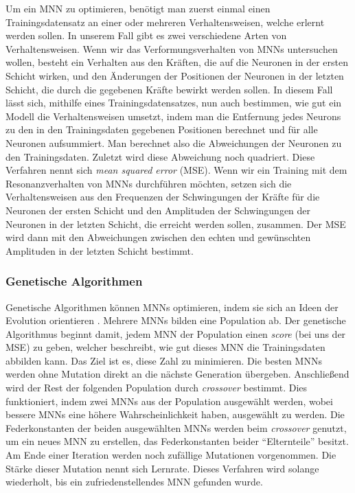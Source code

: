 \documentclass[10pt]{scrartcl}
\newcommand*{\eng}[1]{\textit{#1}}
\newcommand*{\feng}[1]{\eng{#1}}
\begin{document}
Um ein MNN zu optimieren, benötigt man zuerst einmal einen Trainingsdatensatz an einer oder mehreren Verhaltensweisen, welche erlernt werden sollen. In unserem Fall gibt es zwei verschiedene Arten von Verhaltensweisen. Wenn wir das Verformungsverhalten von MNNs untersuchen wollen, besteht ein Verhalten aus den Kräften, die auf die Neuronen in der ersten Schicht wirken, und den Änderungen der Positionen der Neuronen in der letzten Schicht, die durch die gegebenen Kräfte bewirkt werden sollen. In diesem Fall lässt sich, mithilfe eines Trainingsdatensatzes, nun auch bestimmen, wie gut ein Modell die Verhaltensweisen umsetzt, indem man die Entfernung jedes Neurons zu den in den Trainingsdaten gegebenen Positionen berechnet und für alle Neuronen aufsummiert. Man berechnet also die Abweichungen der Neuronen zu den Trainingsdaten. Zuletzt wird diese Abweichung noch quadriert. Diese Verfahren nennt sich \feng{mean squared error} (MSE).
Wenn wir ein Training mit dem Resonanzverhalten von MNNs durchführen möchten, setzen sich die Verhaltensweisen aus den Frequenzen der Schwingungen der Kräfte für die Neuronen der ersten Schicht und den Amplituden der Schwingungen der Neuronen in der letzten Schicht, die erreicht werden sollen, zusammen. Der MSE wird dann mit den Abweichungen zwischen den echten und gewünschten Amplituden in der letzten Schicht bestimmt.

\subsubsection{Genetische Algorithmen}

Genetische Algorithmen können MNNs optimieren, indem sie sich an Ideen der Evolution orientieren \cite{gentisch}. Mehrere MNNs bilden eine Population ab.
Der genetische Algorithmus beginnt damit, jedem MNN der Population einen \feng{score} (bei uns der MSE) zu geben, welcher beschreibt, wie gut dieses MNN die Trainingsdaten abbilden kann. Das Ziel ist es, diese Zahl zu minimieren.
Die besten MNNs werden ohne Mutation direkt an die nächste Generation übergeben.
Anschließend wird der Rest der folgenden Population durch \feng{crossover} bestimmt. Dies funktioniert, indem zwei MNNs aus der Population ausgewählt werden, wobei bessere MNNs eine höhere Wahrscheinlichkeit haben, ausgewählt zu werden.
Die Federkonstanten der beiden ausgewählten MNNs werden beim \feng{crossover} genutzt, um ein neues MNN zu erstellen, das Federkonstanten beider \enquote{Elternteile} besitzt.
Am Ende einer Iteration werden noch zufällige Mutationen vorgenommen. Die Stärke dieser Mutation nennt sich Lernrate.
Dieses Verfahren wird solange wiederholt, bis ein zufriedenstellendes MNN gefunden wurde.
\end{document}
